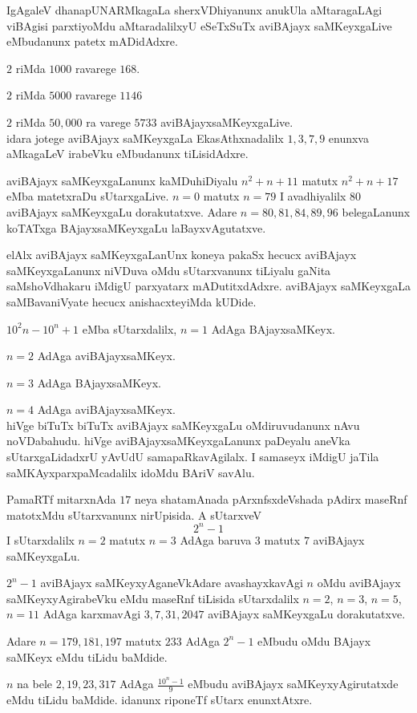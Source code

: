 IgAgaleV dhanapUNARMkagaLa sherxVDhiyanunx anukUla aMtaragaLAgi viBAgisi parxtiyoMdu aMtaradalilxyU eSeTxSuTx aviBAjayx saMKeyxgaLive eMbudanunx patetx mADidAdxre.

$2$ riMda $1000$ ravarege $168$.
 
$2$ riMda $5000$ ravarege $1146$ 

$2$ riMda $50,000$ ra varege $5733$ aviBAjayxsaMKeyxgaLive.\\
idara jotege aviBAjayx saMKeyxgaLa EkasAthxnadalilx $1,3,7,9$ enunxva aMkagaLeV irabeVku eMbudanunx tiLisidAdxre.

aviBAjayx saMKeyxgaLanunx kaMDuhiDiyalu $n^2+n+11$ matutx $n^2+n+17$ eMba matetxraDu sUtarxgaLive. $n=0$ matutx $n=79$ I avadhiyalilx $80$ aviBAjayx saMKeyxgaLu dorakutatxve. Adare $n=80,81,84,89,96$ belegaLanunx koTATxga BAjayxsaMKeyxgaLu laBayxvAgutatxve.

elAlx aviBAjayx saMKeyxgaLanUnx koneya pakaSx hecucx aviBAjayx saMKeyxgaLanunx niVDuva oMdu sUtarxvanunx tiLiyalu gaNita saMshoVdhakaru iMdigU parxyatarx mADutitxdAdxre. aviBAjayx saMKeyxgaLa saMBavaniVyate hecucx anishacxteyiMda kUDide.

$10^2n-10^n+1$ eMba sUtarxdalilx, $n=1$ AdAga BAjayxsaMKeyx. 

$n=2$ AdAga aviBAjayxsaMKeyx.

$n=3$ AdAga BAjayxsaMKeyx.

$n=4$ AdAga aviBAjayxsaMKeyx.\\
hiVge biTuTx biTuTx aviBAjayx saMKeyxgaLu oMdiruvudanunx nAvu noVDabahudu. hiVge aviBAjayxsaMKeyxgaLanunx paDeyalu aneVka sUtarxgaLidadxrU yAvUdU samapaRkavAgilalx. I samaseyx iMdigU jaTila saMKAyxparxpaMcadalilx idoMdu BAriV savAlu.

PamaRTf mitarxnAda $17$ neya shatamAnada pArxnfsxdeVshada pAdirx maseRnf matotxMdu sUtarxvanunx nirUpisida. A sUtarxveV 
$$
2^n-1
$$
I sUtarxdalilx $n=2$ matutx $n=3$ AdAga baruva $3$ matutx $7$ aviBAjayx saMKeyxgaLu.

$2^n-1$ aviBAjayx saMKeyxyAganeVkAdare avashayxkavAgi $n$ oMdu aviBAjayx saMKeyxyAgirabeVku eMdu maseRnf tiLisida sUtarxdalilx $n=2$, $n=3$, $n=5$, $n=11$ AdAga karxmavAgi $3,7,31,2047$ aviBAjayx saMKeyxgaLu dorakutatxve.

Adare $n= 179,181,197$ matutx $233$ AdAga $2^{n}-1$ eMbudu oMdu BAjayx saMKeyx eMdu tiLidu baMdide.

$n$ na bele $2,19,23,317$ AdAga $\frac{10^n-1}{9}$ eMbudu aviBAjayx saMKeyxyAgirutatxde eMdu tiLidu baMdide. idanunx riponeTf sUtarx enunxtAtxre.

